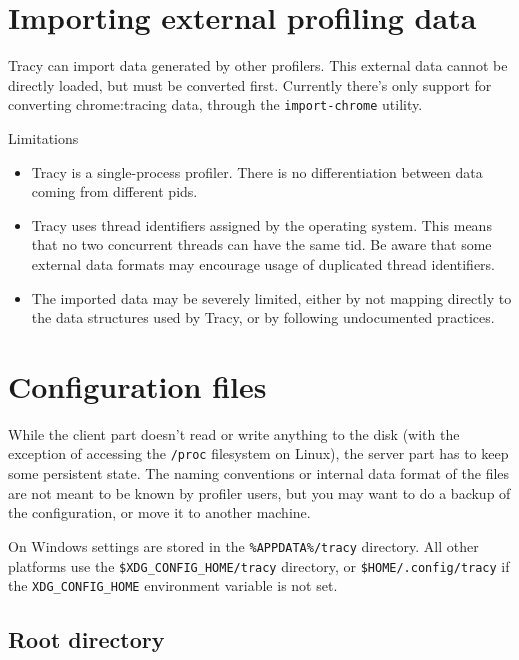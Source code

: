 \documentclass[hidelinks,titlepage,a4paper]{article}
\begin{document}
\section{Importing external profiling data}

Tracy can import data generated by other profilers. This external data cannot be directly loaded, but must be converted first. Currently there's only support for converting chrome:tracing data, through the \texttt{import-chrome} utility.

\begin{bclogo}[
noborder=true,
couleur=black!5,
logo=\bcattention
]{Limitations}
\begin{itemize}
\item Tracy is a single-process profiler. There is no differentiation between data coming from different pids.
\item Tracy uses thread identifiers assigned by the operating system. This means that no two concurrent threads can have the same tid. Be aware that some external data formats may encourage usage of duplicated thread identifiers.
\item The imported data may be severely limited, either by not mapping directly to the data structures used by Tracy, or by following undocumented practices.
\end{itemize}
\end{bclogo}

\section{Configuration files}

While the client part doesn't read or write anything to the disk (with the exception of accessing the \texttt{/proc} filesystem on Linux), the server part has to keep some persistent state. The naming conventions or internal data format of the files are not meant to be known by profiler users, but you may want to do a backup of the configuration, or move it to another machine.

On Windows settings are stored in the \texttt{\%APPDATA\%/tracy} directory. All other platforms use the \texttt{\$XDG\_CONFIG\_HOME/tracy} directory, or \texttt{\$HOME/.config/tracy} if the \texttt{XDG\_CONFIG\_HOME} environment variable is not set.

\subsection{Root directory}
\end{document}
